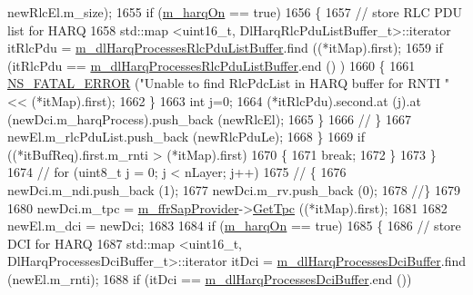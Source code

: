 \begin{DoxyCode}
       newRlcEl.m\_size);
1655               \textcolor{keywordflow}{if} (\hyperlink{classns3_1_1CqaFfMacScheduler_afcb424ab57ad0d96293a7970c0b55dcf}{m\_harqOn} == \textcolor{keyword}{true})
1656                 \{
1657                   \textcolor{comment}{// store RLC PDU list for HARQ}
1658                   std::map <uint16\_t, DlHarqRlcPduListBuffer\_t>::iterator itRlcPdu =  
      \hyperlink{classns3_1_1CqaFfMacScheduler_a019cbb20e91d699a8c7e26fb8d69ff4e}{m\_dlHarqProcessesRlcPduListBuffer}.find ((*itMap).first);
1659                   \textcolor{keywordflow}{if} (itRlcPdu == \hyperlink{classns3_1_1CqaFfMacScheduler_a019cbb20e91d699a8c7e26fb8d69ff4e}{m\_dlHarqProcessesRlcPduListBuffer}.end ()
      )
1660                     \{
1661                       \hyperlink{group__fatal_ga5131d5e3f75d7d4cbfd706ac456fdc85}{NS\_FATAL\_ERROR} (\textcolor{stringliteral}{"Unable to find RlcPdcList in HARQ buffer for RNTI "} <<
       (*itMap).first);
1662                     \}
1663                   \textcolor{keywordtype}{int} j=0;
1664                   (*itRlcPdu).second.at (j).at (newDci.m\_harqProcess).push\_back (newRlcEl);
1665                 \}
1666               \textcolor{comment}{// \}}
1667               newEl.m\_rlcPduList.push\_back (newRlcPduLe);
1668             \}
1669           \textcolor{keywordflow}{if} ((*itBufReq).first.m\_rnti > (*itMap).first)
1670             \{
1671               \textcolor{keywordflow}{break};
1672             \}
1673         \}
1674       \textcolor{comment}{// for (uint8\_t j = 0; j < nLayer; j++)}
1675       \textcolor{comment}{// \{}
1676       newDci.m\_ndi.push\_back (1);
1677       newDci.m\_rv.push\_back (0);
1678       \textcolor{comment}{//\}}
1679 
1680       newDci.m\_tpc = \hyperlink{classns3_1_1CqaFfMacScheduler_a47eeb31f5d284b045d6deba40ac3e108}{m\_ffrSapProvider}->\hyperlink{classns3_1_1LteFfrSapProvider_a0021d72c12fdaddd3817ef0eb5a7cd4e}{GetTpc} ((*itMap).first);
1681 
1682       newEl.m\_dci = newDci;
1683 
1684       \textcolor{keywordflow}{if} (\hyperlink{classns3_1_1CqaFfMacScheduler_afcb424ab57ad0d96293a7970c0b55dcf}{m\_harqOn} == \textcolor{keyword}{true})
1685         \{
1686           \textcolor{comment}{// store DCI for HARQ}
1687           std::map <uint16\_t, DlHarqProcessesDciBuffer\_t>::iterator itDci = 
      \hyperlink{classns3_1_1CqaFfMacScheduler_a4de0e4833545b31fcb31f77492a34380}{m\_dlHarqProcessesDciBuffer}.find (newEl.m\_rnti);
1688           \textcolor{keywordflow}{if} (itDci == \hyperlink{classns3_1_1CqaFfMacScheduler_a4de0e4833545b31fcb31f77492a34380}{m\_dlHarqProcessesDciBuffer}.end ())

\end{DoxyCode}
